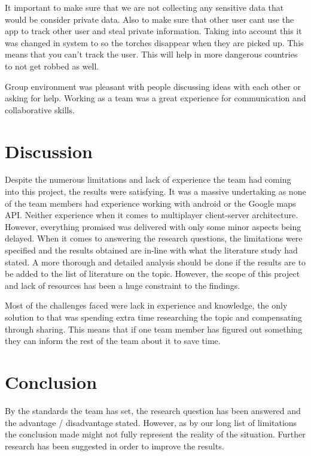 \documentclass[12pt,a4paper,twoside]{report}
\begin{document}
It important to make sure that we are not collecting any sensitive data that would be consider private data. Also to make sure that other user cant use the app to track other user and steal private information. Taking into account this it was changed in system to so the torches disappear when they are picked up. This means that you can't track the user. This will help in more dangerous countries to not get robbed as well.

Group environment was pleasant with people discussing ideas with each other or asking for help. Working as a team was a great experience for communication and collaborative skills. 

\newpage
\section{Discussion}

Despite the numerous limitations and lack of experience the team had coming into this project, the results were satisfying. It was a massive undertaking as none of the team members had experience working with android or the Google maps API. Neither experience when it comes to multiplayer client-server architecture. However, everything promised was delivered with only some minor aspects being delayed. When it comes to answering the research questions, the limitations were specified and the results obtained are in-line with what the literature study had stated. A more thorough and detailed analysis should be done if the results are to be added to the list of literature on the topic. However, the scope of this project and lack of resources has been a huge constraint to the findings.

Most of the challenges faced were lack in experience and knowledge, the only solution to that was spending extra time researching the topic and compensating through sharing. This means that if one team member has figured out something they can inform the rest of the team about it to save time.

\newpage
\section{Conclusion}

By the standards the team has set, the research question has been answered and the advantage / disadvantage stated. However, as by our long list of limitations the conclusion made might not fully represent the reality of the situation. Further research has been suggested in order to improve the results.
\end{document}
